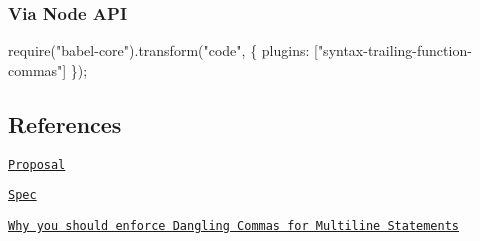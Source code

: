 \subsubsection*{Via Node A\+PI}


\begin{DoxyCode}
require("babel-core").transform("code", \{
  plugins: ["syntax-trailing-function-commas"]
\});
\end{DoxyCode}


\subsection*{References}


\begin{DoxyItemize}
\item \href{https://github.com/jeffmo/es-trailing-function-commas}{\tt Proposal}
\item \href{http://jeffmo.github.io/es-trailing-function-commas/}{\tt Spec}
\item \href{https://medium.com/@nikgraf/why-you-should-enforce-dangling-commas-for-multiline-statements-d034c98e36f8}{\tt Why you should enforce Dangling Commas for Multiline Statements} 
\end{DoxyItemize}